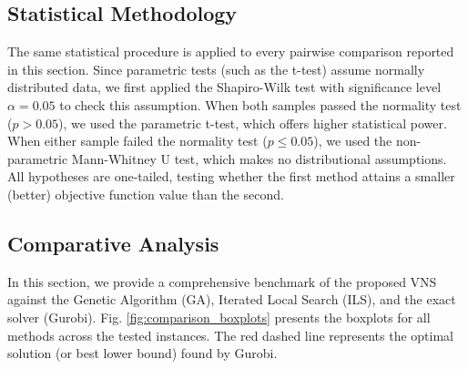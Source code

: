 \documentclass[preprint,12pt,authoryear]{elsarticle}
\begin{document}

\subsection{Statistical Methodology}
\label{subsec:stats_method}

The same statistical procedure is applied to every pairwise comparison reported in this section. Since parametric tests (such as the t-test) assume normally distributed data,
we first applied the Shapiro-Wilk test with significance level $\alpha = 0.05$ to check this assumption. When both samples passed the normality test ($p > 0.05$),
we used the parametric t-test, which offers higher statistical power. When either sample failed the normality test ($p \le 0.05$), we used the non-parametric Mann-Whitney
U test, which makes no distributional assumptions. All hypotheses are one-tailed, testing whether the first method attains a smaller (better) objective function value than
the second.

\subsection{Comparative Analysis}
\label{subsec:main_comparison}

In this section, we provide a comprehensive benchmark of the proposed VNS against the Genetic Algorithm (GA), Iterated Local Search (ILS), and the exact solver (Gurobi). 
Fig. \ref{fig:comparison_boxplots} presents the boxplots for all methods across the tested instances. The red dashed line represents the optimal solution (or best lower bound) found by Gurobi.
\end{document}
